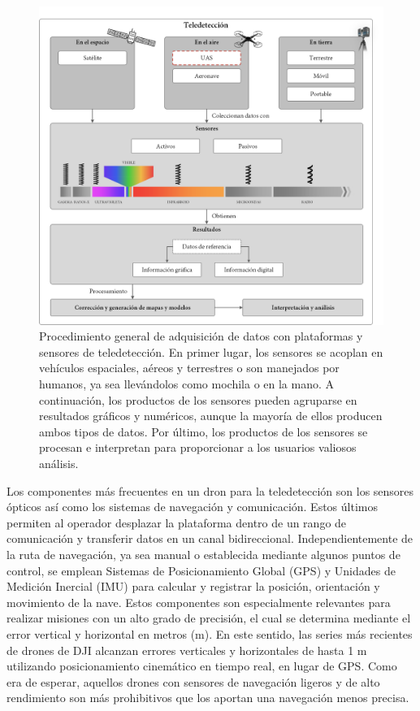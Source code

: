 \begin{figure}[!ht]
	\includegraphics{figs/introduction/introduction_scheme_spanish.png}
	\caption{Procedimiento general de adquisición de datos con plataformas y sensores de teledetección. En primer lugar, los sensores se acoplan en vehículos espaciales, aéreos y terrestres o son manejados por humanos, ya sea llevándolos como mochila o en la mano. A continuación, los productos de los sensores pueden agruparse en resultados gráficos y numéricos, aunque la mayoría de ellos producen ambos tipos de datos. Por último, los productos de los sensores se procesan e interpretan para proporcionar a los usuarios valiosos análisis. }
    \label{fig:introduction_scheme_spanish}
\end{figure}

Los componentes más frecuentes en un dron para la teledetección son los sensores ópticos así como los sistemas de navegación y comunicación. Estos últimos permiten al operador desplazar la plataforma dentro de un rango de comunicación y transferir datos en un canal bidireccional. Independientemente de la ruta de navegación, ya sea manual o establecida mediante algunos puntos de control, se emplean Sistemas de Posicionamiento Global (GPS) y Unidades de Medición Inercial (IMU) para calcular y registrar la posición, orientación y movimiento de la nave. Estos componentes son especialmente relevantes para realizar misiones con un alto grado de precisión, el cual se determina mediante el error vertical y horizontal en metros (\si{\meter}). En este sentido, las series más recientes de drones de DJI alcanzan errores verticales y horizontales de hasta 1 \si{\meter} utilizando posicionamiento cinemático en tiempo real, en lugar de GPS. Como era de esperar, aquellos drones con sensores de navegación ligeros y de alto rendimiento son más prohibitivos que los aportan una navegación menos precisa.    

